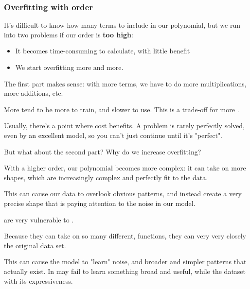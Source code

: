             \subsubsection*{Overfitting with order}
                It's difficult to know how many terms to include in our polynomial, but we run into two problems if our order is \textbf{too high}:

                \begin{itemize}
                    \item It becomes time-consuming to calculate, with little benefit
                    \item We start overfitting more and more.
                \end{itemize}

                The first part makes sense: with more terms, we have to do more multiplications, more additions, etc.\\
                
                \begin{concept}
                    More  tend to be more  to train, and slower to use. This is a trade-off for more . 
                    
                    Usually, there's a point where cost  benefits. A problem is rarely perfectly solved, even by an excellent model, so you can't just continue until it's "perfect".
                \end{concept}

                But what about the second part? Why do we increase overfitting? 

                With a higher order, our polynomial becomes more complex: it can take on more shapes, which are increasingly complex and perfectly fit to the data.

                This can cause our data to overlook obvious patterns, and instead create a very precise shape that is paying attention to the noise in our model.\\

                \begin{concept}
                     are very vulnerable to .

                    Because they can take on so many different,  functions, they can very very closely  the original data set. 
                    
                    This can cause the model to "learn" noise, and  broader and simpler patterns that actually exist. In may fail to learn something broad and useful, while  the dataset with its expressiveness.
                \end{concept}

